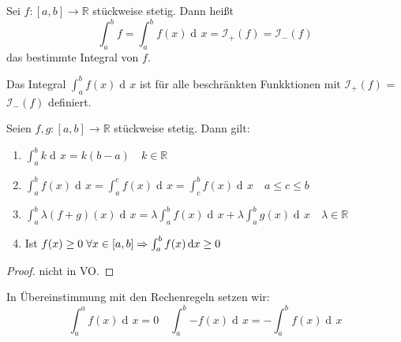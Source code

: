 \documentclass[a4paper,titlepage,oneside]{article}
\def\R{\ensuremath{\mathbb{R}} }
\newcommand{\der}{\operatorname{d\!}{}}
\def\sp{\hspace{0,1cm}}
\newcommand{\integral}[4][x]{\ensuremath{\int_{#2}^{#3}{#4\der #1}}}
\newcommand{\intAB}[2][x]{\integral[#1]{a}{b}{#2}}
\newcommand{\OI}[1]{\ensuremath{\mathcal{I}_+\left(#1\right)}}
\newcommand{\UI}[1]{\ensuremath{\mathcal{I}_-\left(#1\right)}}
\theoremstyle{thmstyle}
\begin{document}
\begin{defi}
Sei $f: [a,b] \to \R$ stückweise stetig. Dann heißt \[\int_{a}^{b}{f} = \intAB{f(x)} = \OI{f} = \UI{f}\] das bestimmte Integral von $f$.
\end{defi}

\begin{bem}
Das Integral \intAB{f(x)} ist für alle beschränkten Funkktionen mit \OI{f} = \UI{f} definiert.
\end{bem}

\begin{satz}[Rechenregeln]
Seien $f,g : [a,b] \to \R$ stückweise stetig. Dann gilt:
\begin{enumerate}
\item $\intAB{k} = k (b-a) \quad k \in \R$
\item $\intAB{f(x)} = \integral{a}{c}{f(x)} = \integral{c}{b}{f(x)} \quad a \le c \le b$
\item $\intAB{\lambda(f+g)(x)} = \lambda \intAB{f(x)} + \lambda \intAB{g(x)} \quad \lambda \in \R$
\item Ist $f(x) \ge 0 \sp \forall x \in [a,b] \Rightarrow \intAB{f(x)} \ge 0$
\end{enumerate}
\begin{proof}
nicht in VO. %
\end{proof}
\end{satz}

\begin{bem}
In Übereinstimmung mit den Rechenregeln setzen wir: \[\integral{a}{a}{f(x)} = 0 \quad \intAB{-f(x)} = -\intAB{f(x)}\]
\end{bem}
\end{document}

